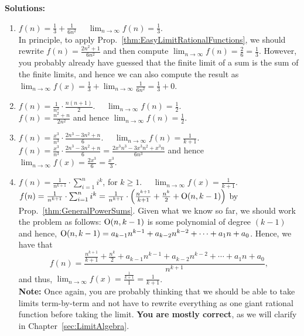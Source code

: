 \textbf{Solutions:}  
\begin{enumerate}
\renewcommand{\labelenumi}{(\alph{enumi})}
\setlength{\itemsep}{.2cm}
     \item  $f(n) = \frac{1}{3} + \frac{1}{6n^2} $ ~~\Ans $\displaystyle\lim_{n \to \infty} f(n) = \frac{1}{3} $. \\

In principle, to apply Prop.~\ref{thm:EasyLimitRationalFunctions}, we should rewrite  $f(n) =  \frac{2 n^2 + 1}{6n^2}$ and then compute  $\displaystyle\lim_{n \to \infty} f(n) = \frac{2}{6}  = \frac{1}{3} $. However, you probably already have guessed that the finite limit of a sum is the sum of the finite limits, and hence we can also compute the result as  $\displaystyle\lim_{n \to \infty} f(x) =  \frac{1}{3} + \displaystyle\lim_{n \to \infty}  \frac{1}{6n^2} =  \frac{1}{3} + 0$.
     
        \item   $f(n) = \frac{1}{n^2} \cdot \frac{n(n+1)}{2} $.  ~~\Ans $\displaystyle\lim_{n \to \infty} f(n) = \frac{1}{2} $. \\

$f(n) =  \frac{n^2 + n}{2n^2}$ and hence  $\displaystyle\lim_{n \to \infty} f(n) = \frac{1}{2}$. 

    \item   $f(n) =  \frac{x^3}{n^3} \cdot \frac{2n^3 - 3n^2 + n}{6}$.  ~~\Ans $\displaystyle\lim_{n \to \infty} f(n) = \frac{1}{k+1} $. \\

$f(n) =  \frac{x^3}{n^3} \cdot \frac{2n^3 - 3n^2 + n}{6} = \frac{2x^3 n^3 - 3 x^3n^2 + x^3n}{6n^3}$ and hence  $\displaystyle\lim_{n \to \infty} f(x) = \frac{2x^3}{6} = \frac{x^3}{3}$. 
    
    \item $f(n) =  \frac{1}{n^{k+1}} \cdot \sum_{i=1}^{n}i^k$, for $k \ge 1$.  ~~\Ans $\displaystyle\lim_{n \to \infty} f(x) = \frac{1}{k+1} $. \\

$f(n) =  \frac{1}{n^{k+1}} \cdot \sum_{i=1}^{n}i^k =  \frac{1}{n^{k+1}} \cdot \left(\frac{n^{k+1}}{k+1} + \frac{n^k}{2} + \mathrm{O}(n,k-1) \right)$ by Prop.~\ref{thm:GeneralPowerSums}.  Given what we know so far, we should work the problem as follows: $\mathrm{O}(n,k-1)$ is some polynomial of degree $(k-1)$ and hence,  $\mathrm{O}(n,k-1) = a_{k-1} n^{k-1} +  a_{k-2} n^{k-2} + \cdots + a_1 n + a_0$. Hence, we have that
$$f(n) =\frac{\frac{n^{k+1}}{k+1} + \frac{n^k}{2} + a_{k-1} n^{k-1} +  a_{k-2} n^{k-2} + \cdots + a_1 n + a_0 }{ n^{k+1} }, $$ 
and thus, $\displaystyle\lim_{n \to \infty} f(x) = \frac{ \frac{1}{k+1}}{1} = \frac{1}{k+1}$. \\

\textbf{Note:} Once again, you are probably thinking that we should be able to take limits term-by-term and not have to rewrite everything as one giant rational function before taking the limit. \textbf{You are mostly correct}, as we will clarify in Chapter~\ref{sec:LimitAlgebra}.
\end{enumerate} 

